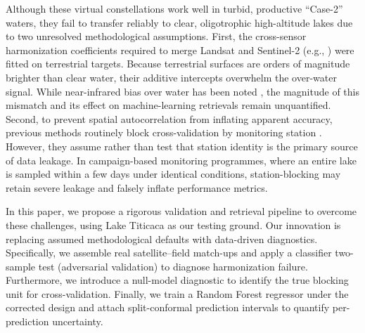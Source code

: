 \documentclass[preprint,review,12pt,authoryear]{elsarticle}
\begin{document}
Although these virtual constellations work well in turbid, productive ``Case-2'' waters, they fail to transfer reliably to clear, oligotrophic high-altitude lakes due to two unresolved methodological assumptions. First, the cross-sensor harmonization coefficients required to merge Landsat and Sentinel-2 (e.g., \citealp{Roy2016}) were fitted on terrestrial targets. Because terrestrial surfaces are orders of magnitude brighter than clear water, their additive intercepts overwhelm the over-water signal. While near-infrared bias over water has been noted \citep{Pahlevan2019}, the magnitude of this mismatch and its effect on machine-learning retrievals remain unquantified. Second, to prevent spatial autocorrelation from inflating apparent accuracy, previous methods routinely block cross-validation by monitoring station \citep{Roberts2017}. However, they assume rather than test that station identity is the primary source of data leakage. In campaign-based monitoring programmes, where an entire lake is sampled within a few days under identical conditions, station-blocking may retain severe leakage and falsely inflate performance metrics. 

In this paper, we propose a rigorous validation and retrieval pipeline to overcome these challenges, using Lake Titicaca as our testing ground. Our innovation is replacing assumed methodological defaults with data-driven diagnostics. Specifically, we assemble \numMatchupsTotal{} real satellite--field match-ups and apply a classifier two-sample test (adversarial validation) \citep{LopezPaz2017} to diagnose harmonization failure. Furthermore, we introduce a null-model diagnostic to identify the true blocking unit for cross-validation. Finally, we train a Random Forest regressor under the corrected design and attach split-conformal prediction intervals \citep{Angelopoulos2023} to quantify per-prediction uncertainty. 
\end{document}
